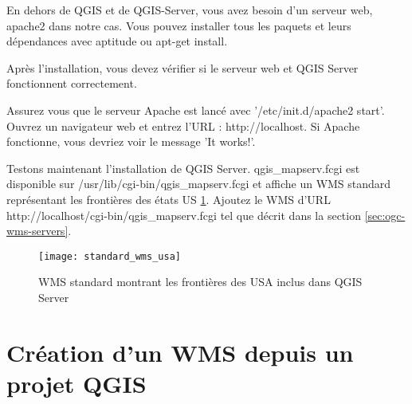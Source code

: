 En dehors de QGIS et de QGIS-Server, vous avez besoin d'un serveur web, apache2 dans notre cas. Vous pouvez installer tous les paquets et leurs dépendances avec aptitude ou apt-get install.

Après l'installation, vous devez vérifier si le serveur web et QGIS Server fonctionnent correctement.

Assurez vous que le serveur Apache est lancé avec '/etc/init.d/apache2 start'. Ouvrez un navigateur web et entrez l'URL : http://localhost. Si Apache fonctionne, vous devriez voir le message 'It works!'.

Testons maintenant l'installation de QGIS Server. qgis\_mapserv.fcgi est disponible sur /usr/lib/cgi-bin/qgis\_mapserv.fcgi et affiche un WMS standard représentant les frontières des états US \ref{fig:usa_wms}. Ajoutez le WMS d'URL http://localhost/cgi-bin/qgis\_mapserv.fcgi tel que décrit dans la section \ref{sec:ogc-wms-servers}.

\begin{figure}[ht]
\centering
\texttt{[image: standard\_wms\_usa]}
\caption{WMS standard montrant les frontières des USA inclus dans QGIS Server \nixcaption}
\label{fig:usa_wms}
\end{figure}

\section{Création d'un WMS depuis un projet QGIS}

